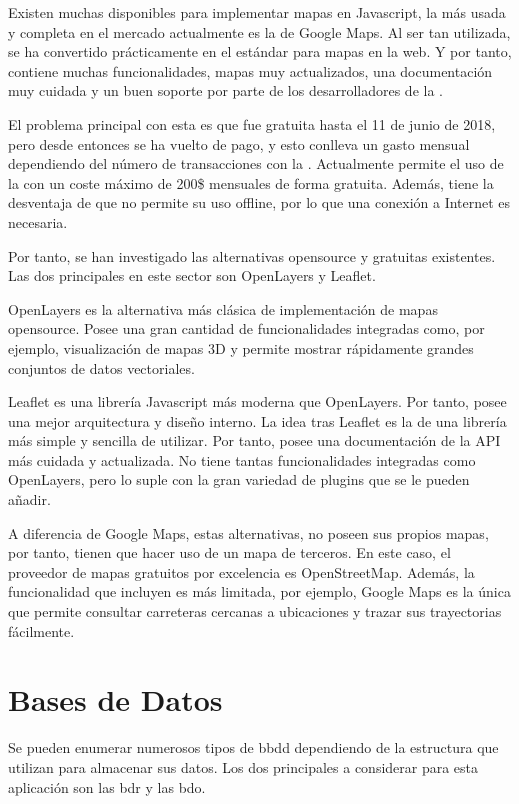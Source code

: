     Existen muchas  disponibles para implementar mapas en Javascript, la más usada y completa en el mercado actualmente es la de Google Maps\cite{gmaps}. Al ser tan utilizada, se ha convertido prácticamente en el estándar para mapas en la web. Y por tanto, contiene muchas funcionalidades, mapas muy actualizados, una documentación muy cuidada y un buen soporte por parte de los desarrolladores de la .
    
    El problema principal con esta  es que fue gratuita hasta el 11 de junio de 2018, pero desde entonces se ha vuelto de pago, y esto conlleva un gasto mensual dependiendo del número de transacciones con la . Actualmente permite el uso de la  con un coste máximo de 200\$ mensuales de forma gratuita. Además, tiene la desventaja de que no permite su uso offline, por lo que una conexión a Internet es necesaria.

    
    Por tanto, se han investigado las alternativas opensource y gratuitas existentes. Las dos  principales en este sector son OpenLayers\cite{openlayers} y Leaflet\cite{leaflet}.
    
    OpenLayers es la alternativa más clásica de implementación de mapas opensource. Posee una gran cantidad de funcionalidades integradas como, por ejemplo, visualización de mapas 3D y permite mostrar rápidamente grandes conjuntos de datos vectoriales.
    
    Leaflet es una librería Javascript más moderna que OpenLayers. Por tanto, posee una mejor arquitectura y diseño interno. La idea tras Leaflet es la de una librería más simple y sencilla de utilizar. Por tanto, posee una documentación de la API más cuidada y actualizada. No tiene tantas funcionalidades integradas como OpenLayers, pero lo suple con la gran variedad de plugins que se le pueden añadir.
    
    A diferencia de Google Maps, estas alternativas, no poseen sus propios mapas, por tanto, tienen que hacer uso de un mapa de terceros. En este caso, el proveedor de mapas gratuitos por excelencia es OpenStreetMap\cite{osm}. Además, la funcionalidad que incluyen es más limitada, por ejemplo, Google Maps es la única que permite consultar carreteras cercanas a ubicaciones y trazar sus trayectorias fácilmente.
  
  
  \section{Bases de Datos}
    Se pueden enumerar numerosos tipos de \ac{bbdd} dependiendo de la estructura que utilizan para almacenar sus datos. Los dos principales a considerar para esta aplicación son las \ac{bdr} y las \ac{bdo}.
    
